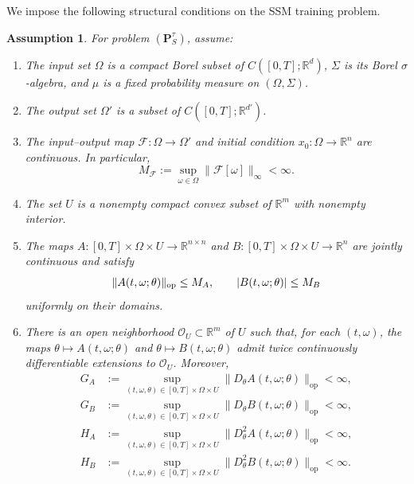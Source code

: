 \documentclass[11pt]{amsart}
\numberwithin{equation}{section} %
\DeclarePairedDelimiter{\abs}{\lvert}{\rvert}
\newtheorem{assumption}{Assumption}[section]
\theoremstyle{remark}
\begin{document}
We impose the following structural conditions on the SSM training problem.
\begin{assumption}\label{asp:main_asp}
    For problem $(\mathbf P_S^\tau)$, assume:
    \begin{enumerate}
        \item The input set $\Omega$ is a compact Borel subset of
        $C([0,T];\mathbb R^d)$, $\Sigma$ is its Borel $\sigma$-algebra,
        and $\mu$ is a fixed probability measure on $(\Omega,\Sigma)$.
        \item The output set $\Omega'$ is a subset of
        $C([0,T];\mathbb R^{d'})$.
        \item The input--output map $\mathcal F:\Omega\to\Omega'$ and
        initial condition $x_0:\Omega\to\mathbb R^n$ are continuous.
        In particular,
        \[
            M_{\mathcal F}:=\sup_{\omega\in\Omega}
            \|\mathcal F[\omega]\|_\infty<\infty.
        \]
        \item The set $U$ is a nonempty compact convex subset of $\mathbb R^m$ with nonempty interior.
        \item The maps
        $A:[0,T]\times\Omega\times U\to\mathbb R^{n\times n}$ and
        $B:[0,T]\times\Omega\times U\to\mathbb R^n$ are jointly
        continuous and satisfy
        \[
            \|A(t,\omega;\theta)\|_{\mathrm{op}}\le M_A,\qquad
            \abs{B(t,\omega;\theta)}\le M_B
        \]
        uniformly on their domains.
        \item There is an open neighborhood $\mathcal O_U\subset\mathbb R^m$
        of $U$ such that, for each $(t,\omega)$, the maps
        $\theta\mapsto A(t,\omega;\theta)$ and
        $\theta\mapsto B(t,\omega;\theta)$ admit twice continuously
        differentiable extensions to $\mathcal O_U$. Moreover,
        \begin{align*}
            G_A&:=\sup_{(t,\omega,\theta)\in[0,T]\times\Omega\times U}
            \|D_\theta A(t,\omega;\theta)\|_{\mathrm{op}}<\infty,\\
            G_B&:=\sup_{(t,\omega,\theta)\in[0,T]\times\Omega\times U}
            \|D_\theta B(t,\omega;\theta)\|_{\mathrm{op}}<\infty,\\
            H_A&:=\sup_{(t,\omega,\theta)\in[0,T]\times\Omega\times U}
            \|D_\theta^2 A(t,\omega;\theta)\|_{\mathrm{op}}<\infty,\\
            H_B&:=\sup_{(t,\omega,\theta)\in[0,T]\times\Omega\times U}
            \|D_\theta^2 B(t,\omega;\theta)\|_{\mathrm{op}}<\infty.
        \end{align*}
    \end{enumerate}
\end{assumption}
\end{document}
